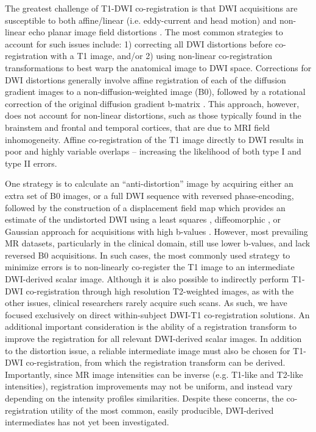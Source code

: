 The greatest challenge of T1-DWI co-registration is that DWI acquisitions are susceptible to both affine/linear (i.e. eddy-current and head motion) and non-linear echo planar image field distortions \cite{Rohde2004}. The most common strategies to account for such issues include: 1) correcting all DWI distortions before co-registration with a T1 image, and/or 2) using non-linear co-registration transformations to best warp the anatomical image to DWI space. Corrections for DWI distortions generally involve affine registration of each of the diffusion gradient images to a non-diffusion-weighted image (B0), followed by a rotational correction of the original diffusion gradient b-matrix \cite{Leemans2009}. This approach, however, does not account for non-linear distortions, such as those typically found in the brainstem and frontal and temporal cortices, that are due to MRI field inhomogeneity. Affine co-registration of the T1 image directly to DWI results in poor and highly variable overlaps – increasing the likelihood of both type I and type II errors. 

One strategy is to calculate an “anti-distortion” image by acquiring either an extra set of B0 images, or a full DWI sequence with reversed phase-encoding, followed by the construction of a displacement field map which provides an estimate of the undistorted DWI using a least squares \cite{Andersson2003c}, diffeomorphic \cite{Irfanoglu2015}, or Gaussian approach for acquisitions with high b-values \cite{Andersson2015}. However, most prevailing MR datasets, particularly in the clinical domain, still use lower b-values, and lack reversed B0 acquisitions. In such cases, the most commonly used strategy to minimize errors is to non-linearly co-register the T1 image to an intermediate DWI-derived scalar image. Although it is also possible to indirectly perform T1-DWI co-registration through high resolution T2-weighted images, as with the other issues, clinical researchers rarely acquire such scans. As such, we have focused exclusively on direct within-subject DWI-T1 co-registration solutions. 
An additional important consideration is the ability of a registration transform to improve the registration for all relevant DWI-derived scalar images. In addition to the distortion issue, a reliable intermediate image must also be chosen for T1-DWI co-registration, from which the registration transform can be derived. Importantly, since MR image intensities can be inverse (e.g. T1-like and T2-like intensities),  registration improvements may not be uniform, and instead vary depending on the intensity profiles similarities. Despite these concerns, the co-registration utility of the most common, easily producible, DWI-derived intermediates has not yet been investigated. 

